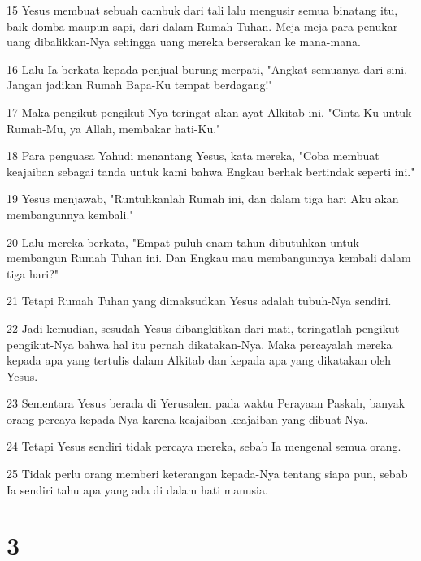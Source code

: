 \par 15 Yesus membuat sebuah cambuk dari tali lalu mengusir semua binatang itu, baik domba maupun sapi, dari dalam Rumah Tuhan. Meja-meja para penukar uang dibalikkan-Nya sehingga uang mereka berserakan ke mana-mana.
\par 16 Lalu Ia berkata kepada penjual burung merpati, "Angkat semuanya dari sini. Jangan jadikan Rumah Bapa-Ku tempat berdagang!"
\par 17 Maka pengikut-pengikut-Nya teringat akan ayat Alkitab ini, "Cinta-Ku untuk Rumah-Mu, ya Allah, membakar hati-Ku."
\par 18 Para penguasa Yahudi menantang Yesus, kata mereka, "Coba membuat keajaiban sebagai tanda untuk kami bahwa Engkau berhak bertindak seperti ini."
\par 19 Yesus menjawab, "Runtuhkanlah Rumah ini, dan dalam tiga hari Aku akan membangunnya kembali."
\par 20 Lalu mereka berkata, "Empat puluh enam tahun dibutuhkan untuk membangun Rumah Tuhan ini. Dan Engkau mau membangunnya kembali dalam tiga hari?"
\par 21 Tetapi Rumah Tuhan yang dimaksudkan Yesus adalah tubuh-Nya sendiri.
\par 22 Jadi kemudian, sesudah Yesus dibangkitkan dari mati, teringatlah pengikut-pengikut-Nya bahwa hal itu pernah dikatakan-Nya. Maka percayalah mereka kepada apa yang tertulis dalam Alkitab dan kepada apa yang dikatakan oleh Yesus.
\par 23 Sementara Yesus berada di Yerusalem pada waktu Perayaan Paskah, banyak orang percaya kepada-Nya karena keajaiban-keajaiban yang dibuat-Nya.
\par 24 Tetapi Yesus sendiri tidak percaya mereka, sebab Ia mengenal semua orang.
\par 25 Tidak perlu orang memberi keterangan kepada-Nya tentang siapa pun, sebab Ia sendiri tahu apa yang ada di dalam hati manusia.

\chapter{3}

